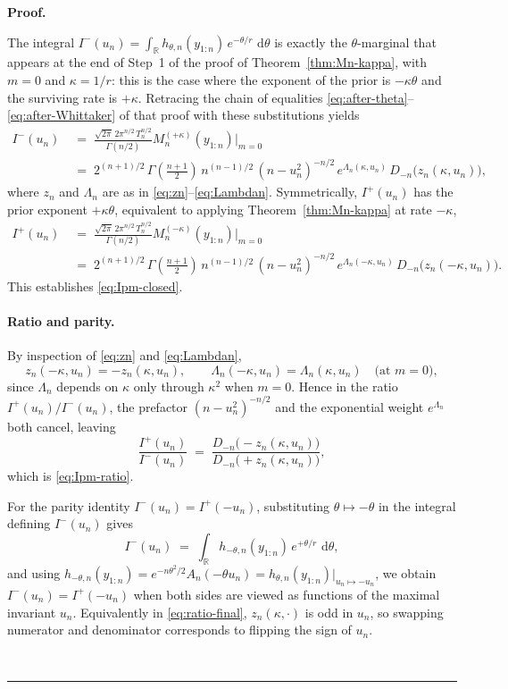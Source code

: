 \documentclass{article}%
\newenvironment{proof}[1][Proof]{\noindent\textbf{#1.} }{\ \rule{0.5em}{0.5em}}
\newcommand{\dd}{\,\mathrm{d}}
\newcommand{\1}{\mathbf{1}}
\begin{document}
\begin{proof}
\begin{enumerate}
The integral $I^-(u_n) = \int_\mathbb{R} h_{\theta,n}(y_{1:n})\,e^{-\theta/r}\,
\dd\theta$ is exactly the $\theta$-marginal that appears at the end of
Step~1 of the proof of Theorem~\ref{thm:Mn-kappa}, with $m=0$ and
$\kappa = 1/r$: this is the case where the exponent of the prior is
$-\kappa\theta$ and the surviving rate is $+\kappa$. Retracing the
chain of equalities \eqref{eq:after-theta}--\eqref{eq:after-Whittaker}
of that proof with these substitutions yields
\begin{align*}
  I^-(u_n)
  &  \;=\; \frac{\sqrt{2\pi} \, 2\pi^{n/2} \, T_n^{n/2} }{\Gamma(n/2)} M_n^{(+\kappa)}(y_{1:n})\big|_{m=0} \\
  & \;=\;2^{(n+1)/2} \, \Gamma \left( \frac{n+1}{2}\right) \, n^{(n-1)/2} \, (n-u_n^2)^{-n/2} \,
  e^{\Lambda_n(\kappa,u_n)}\,
  D_{-n}\!\bigl(z_n(\kappa,u_n)\bigr)
  ,
\end{align*}
where $z_n$ and $\Lambda_n$ are as in
\eqref{eq:zn}--\eqref{eq:Lambdan}. Symmetrically, $I^+(u_n)$ has the
prior exponent $+\kappa\theta$, equivalent to applying
Theorem~\ref{thm:Mn-kappa} at rate $-\kappa$,
\begin{align*}
  I^+(u_n)
  & \;=\; \frac{\sqrt{2\pi} \, 2\pi^{n/2} \, T_n^{n/2} }{\Gamma(n/2)} M_n^{(-\kappa)}(y_{1:n})\big|_{m=0}\\
  & \;=\; 2^{(n+1)/2} \, \Gamma \left( \frac{n+1}{2}\right) \, n^{(n-1)/2} \, (n-u_n^2)^{-n/2} \, 
  e^{\Lambda_n(-\kappa,u_n)}\,
  D_{-n}\!\bigl(z_n(-\kappa,u_n)\bigr).
\end{align*}
This establishes \eqref{eq:Ipm-closed}.

\paragraph{Ratio and parity.} By inspection of \eqref{eq:zn} and \eqref{eq:Lambdan},
\[
  z_n(-\kappa,u_n) = -z_n(\kappa,u_n),
  \qquad
  \Lambda_n(-\kappa,u_n) = \Lambda_n(\kappa,u_n)
  \quad\text{(at $m=0$)},
\]
since $\Lambda_n$ depends on $\kappa$ only through $\kappa^2$ when
$m=0$. Hence in the ratio $I^+(u_n)/I^-(u_n)$, the prefactor
$(n-u_n^2)^{-n/2}$ and the exponential weight $e^{\Lambda_n}$
both cancel, leaving
\begin{equation}\label{eq:ratio-final}
  \frac{I^+(u_n)}{I^-(u_n)}
  \;=\;\frac{D_{-n}\!\bigl(-z_n(\kappa,u_n)\bigr)}
            {D_{-n}\!\bigl(+z_n(\kappa,u_n)\bigr)},
\end{equation}
which is \eqref{eq:Ipm-ratio}.


For the parity identity $I^-(u_n) = I^+(-u_n)$, substituting
$\theta\mapsto-\theta$ in the integral defining $I^-(u_n)$ gives
\[
  I^-(u_n)
  \;=\;\int_\mathbb{R} h_{-\theta,n}(y_{1:n})\,e^{+\theta/r}\,\dd\theta,
\]
and using $h_{-\theta,n}(y_{1:n}) = e^{-n\theta^2/2}A_n(-\theta u_n)
= h_{\theta,n}(y_{1:n})\big|_{u_n\mapsto-u_n}$, we obtain
$I^-(u_n) = I^+(-u_n)$ when both sides are viewed as functions of
the maximal invariant $u_n$. Equivalently in
\eqref{eq:ratio-final}, $z_n(\kappa,\cdot)$ is odd in $u_n$, so
swapping numerator and denominator corresponds to flipping the sign of
$u_n$.


\end{enumerate}
\end{proof}
\end{document}
